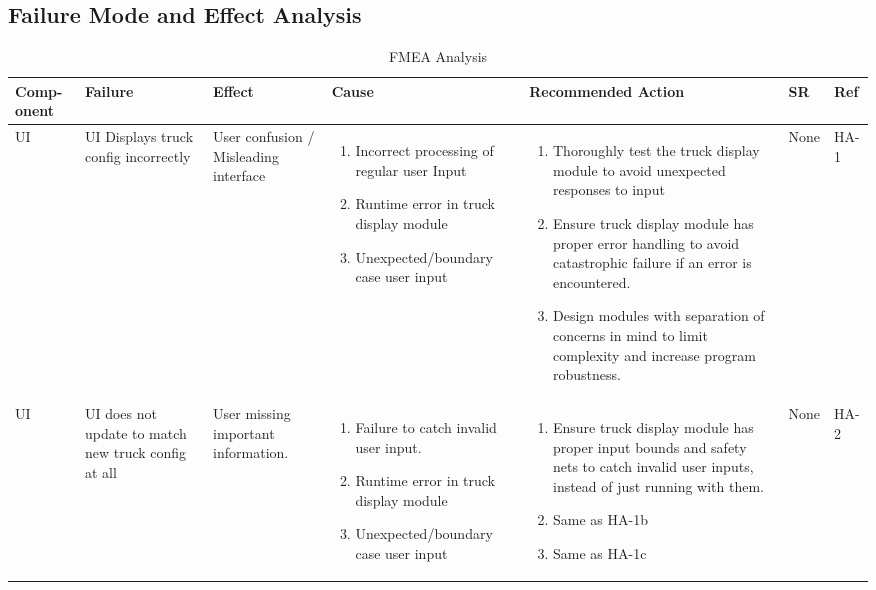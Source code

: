 \documentclass{article}
\begin{document}
\begin{landscape}

\section{Failure Mode and Effect Analysis}
\begin{longtable}{|p{} | p{} | p{} | p{} | p{} | p{} | p{}|}
  \caption{FMEA Analysis}
  \label{TblFMEA}\\
  \hline
  \textbf{Comp- onent} & \textbf{Failure} & \textbf{Effect} & \textbf{Cause} & \textbf{Recommended Action} & \textbf{SR} & \textbf{Ref}\\
  \hline
  \endhead
  UI & UI Displays truck config incorrectly & User confusion / Misleading interface &
  \begin{enumerate}[leftmargin=*, label={\alph*.}, itemsep=1pt, topsep=0pt, partopsep=0pt] 
    \item Incorrect processing of regular user Input
    \item Runtime error in truck display module
    \item Unexpected/boundary case user input
  \end{enumerate} &
  \begin{enumerate}[leftmargin=*, label={\alph*.}, itemsep=1pt, topsep=0pt, partopsep=0pt] 
    \item Thoroughly test the truck display module to avoid unexpected responses to input
    \item  Ensure truck display module has proper error handling to avoid catastrophic failure if an error is encountered.
    \item Design modules with separation of concerns in mind to limit complexity and increase program robustness.
  \end{enumerate} & 
  None & HA-1 \\

  \hline

  UI & UI does not update to match new truck config at all & User missing important information. & 
  \begin{enumerate}[leftmargin=*, label={\alph*.}, itemsep=1pt, topsep=0pt, partopsep=0pt] 
    \item Failure to catch invalid user input.
    \item Runtime error in truck display module
    \item Unexpected/boundary case user input
  \end{enumerate} &
  \begin{enumerate}[leftmargin=*, label={\alph*.}, itemsep=1pt, topsep=0pt, partopsep=0pt] 
    \item Ensure truck display module has proper input bounds and safety nets to catch invalid user inputs, instead of just running with them.
    \item Same as HA-1b
    \item Same as HA-1c
  \end{enumerate} & 
  None & HA-2 \\


\end{longtable}
\end{landscape}
\end{document}
